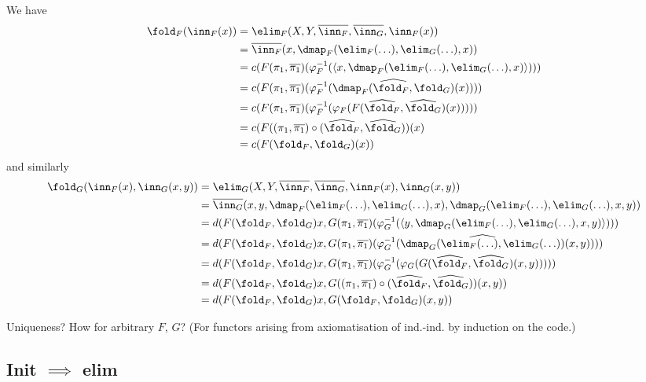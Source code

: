 \documentclass{article}
\begin{document}
We have
\begin{align*}
  \fold_F(\inn_F(x))
  &= \elim_F(X, Y, \overline{\inn_F}, \overline{\inn_G}, \inn_F(x)) \\
  &= \overline{\inn_F}(x, \dmap_F(\elim_F(\ldots), \elim_G(\ldots), x)) \\
  &= c(F(\pi_1,\overline{\pi_1})(\varphi_F^{-1}(\langle x , \dmap_F(\elim_F(\ldots), \elim_G(\ldots), x)\rangle))) \\
  &= c(F(\pi_1,\overline{\pi_1})(\varphi_F^{-1}(\widehat{\dmap_F(\fold_F, \fold_G)}(x)))) \\
  &= c(F(\pi_1,\overline{\pi_1})(\varphi_F^{-1}(\varphi_F(F(\widehat{\fold_F}, \widehat{\fold_G})(x))))) \\
  &= c(F((\pi_1,\overline{\pi_1}) \circ (\widehat{\fold_F}, \widehat{\fold_G}))(x) \\
  &= c(F(\fold_F, \fold_G)(x)) \\
\end{align*}
and similarly
\begin{align*}
  \fold_G(\inn_F(x), \inn_G(x, y))
  &= \elim_G(X, Y, \overline{\inn_F}, \overline{\inn_G}, \inn_F(x), \inn_G(x, y)) \\
  &= \overline{\inn_G}(x, y, \dmap_F(\elim_F(\ldots), \elim_G(\ldots), x), \dmap_G(\elim_F(\ldots), \elim_G(\ldots), x, y)) \\
  &= d(F(\fold_F, \fold_G)x,  G(\pi_1,\overline{\pi_1})(\varphi_G^{-1}(\langle y , \dmap_G(\elim_F(\ldots), \elim_G(\ldots), x, y)\rangle))) \\
  &= d(F(\fold_F, \fold_G)x,  G(\pi_1,\overline{\pi_1})(\varphi_G^{-1}(\widehat{\dmap_G(\elim_F(\ldots), \elim_G(\ldots))}(x, y)))) \\
  &= d(F(\fold_F, \fold_G)x,  G(\pi_1,\overline{\pi_1})(\varphi_G^{-1}(\varphi_G(G(\widehat{\fold_F}, \widehat{\fold_G})(x, y))))) \\
  &= d(F(\fold_F, \fold_G)x,  G((\pi_1,\overline{\pi_1}) \circ (\widehat{\fold_F}, \widehat{\fold_G}))(x, y)) \\
  &= d(F(\fold_F, \fold_G)x,  G(\fold_F, \fold_G)(x, y)) \\
\end{align*}

\begin{question}
  Uniqueness? How for arbitrary $F$, $G$? (For functors arising from
  axiomatisation of ind.-ind. by induction on the code.)
\end{question}

\subsection{Init $\implies$ elim}
\end{document}
